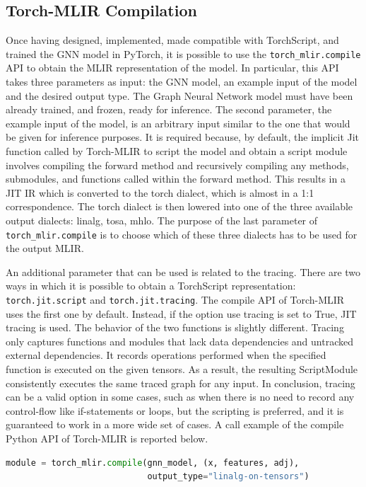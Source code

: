 \subsection{Torch-MLIR Compilation}
\label{subsec:torch-mlir-compilation}%

Once having designed, implemented, made compatible with TorchScript, and trained the GNN model in PyTorch, it is possible to use the \lstinline{torch_mlir.compile} API to obtain the MLIR representation of the model.
In particular, this API takes three parameters as input: the GNN model, an example input of the model and the desired output type.
The Graph Neural Network model must have been already trained, and frozen, ready for inference.
The second parameter, the example input of the model, is an arbitrary input similar to the one that would be given for inference purposes.
It is required because, by default, the implicit Jit function called by Torch-MLIR to script the model and obtain a script module involves compiling the forward method and recursively compiling any methods, submodules, and functions called within the forward method.
This results in a JIT IR which is converted to the torch dialect, which is almost in a 1:1 correspondence.
The torch dialect is then lowered into one of the three available output dialects: linalg, tosa, mhlo.
The purpose of the last parameter of \lstinline{torch_mlir.compile} is to choose which of these three dialects has to be used for the output MLIR\@.

An additional parameter that can be used is related to the tracing.
There are two ways in which it is possible to obtain a TorchScript representation: \lstinline{torch.jit.script} and \lstinline{torch.jit.tracing}.
The compile API of Torch-MLIR uses the first one by default.
Instead, if the option use tracing is set to True, JIT tracing is used.
The behavior of the two functions is slightly different.
Tracing only captures functions and modules that lack data dependencies and untracked external dependencies.
It records operations performed when the specified function is executed on the given tensors.
As a result, the resulting ScriptModule consistently executes the same traced graph for any input.
In conclusion, tracing can be a valid option in some cases, such as when there is no need to record any control-flow like if-statements or loops, but the scripting is preferred, and it is guaranteed to work in a more wide set of cases.
A call example of the compile Python API of Torch-MLIR is reported below.
\begin{lstlisting}[language=Python,label={lst:torch_mlir-compile}]
module = torch_mlir.compile(gnn_model, (x, features, adj),
                            output_type="linalg-on-tensors")
\end{lstlisting}

